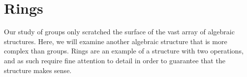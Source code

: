 \chapter{Rings}

Our study of groups only scratched the surface of the vast array of algebraic structures.
Here, we will examine another algebraic structure that is more complex than groups.
Rings are an example of a structure with two operations, and as such require fine attention to detail in order to guarantee that the structure makes sense.


